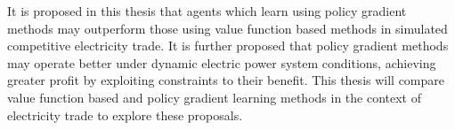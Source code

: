It is proposed in this thesis that agents which learn using policy gradient
methods may outperform those using value function based methods in simulated
competitive electricity trade.  It is further proposed that policy gradient
methods may operate better under dynamic electric power system conditions,
achieving greater profit by exploiting constraints to their benefit. This thesis
will compare value function based and policy gradient learning methods in the
context of electricity trade to explore these proposals.




